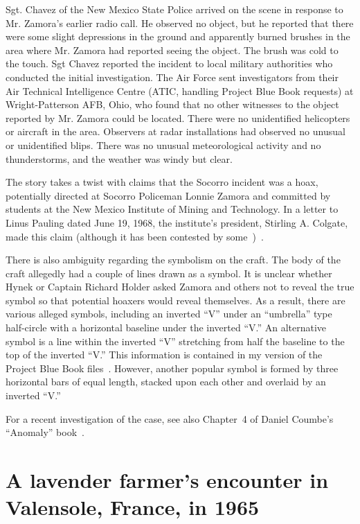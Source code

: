 Sgt. Chavez of the New Mexico State Police arrived on the scene in response to Mr. Zamora's earlier radio call. He observed no object, but he reported that there were some slight depressions in the ground and apparently burned brushes in the area where Mr. Zamora had reported seeing the object. The brush was cold to the touch. Sgt Chavez reported the incident to local military authorities who conducted the initial investigation. The Air Force sent investigators from their Air Technical Intelligence Centre (ATIC, handling Project Blue Book requests) at Wright-Patterson AFB, Ohio, who found that no other witnesses to the object reported by Mr. Zamora could be located. There were no unidentified helicopters or aircraft in the area. Observers at radar installations had observed no unusual or unidentified blips. There was no unusual meteorological activity and no thunderstorms, and the weather was windy but clear.


The story takes a twist with claims that the Socorro incident was a hoax, potentially directed at Socorro Policeman Lonnie Zamora and committed by students at the New Mexico Institute of Mining and Technology. In a letter to Linus Pauling dated June 19, 1968, the institute's president, Stirling A. Colgate, made this claim (although it has been contested by some~\cite{Moss2021Jan})~\cite{Bragalia-hoax}.

There is also ambiguity regarding the symbolism on the craft. The body of the craft allegedly had a couple of lines drawn as a symbol.
It is unclear whether Hynek or Captain Richard Holder
asked Zamora and others not to reveal the true symbol so that potential hoaxers would reveal themselves.
As a result, there are various alleged symbols, including an inverted ``V'' under an ``umbrella''
type half-circle with a horizontal baseline under the inverted ``V.''
An alternative symbol is a line within the inverted ``V'' stretching from half the baseline to the top of the inverted ``V.''
This information is contained in my version of the Project Blue Book files~\cite[1964-04-8694587-Socorro-NewMexico]{bluebook-directory-listing}.
However, another popular symbol is formed by three horizontal bars of equal length, stacked upon each other and overlaid by an inverted ``V.''

For a recent investigation of the case, see also Chapter~4 of Daniel Coumbe's ``Anomaly'' book~\cite{Coumbe2022Oct}.

\section{A lavender farmer's encounter in Valensole, France, in 1965}

